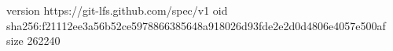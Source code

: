 version https://git-lfs.github.com/spec/v1
oid sha256:f21112ee3a56b52ce5978866385648a918026d93fde2e2d0d4806e4057e500af
size 262240
